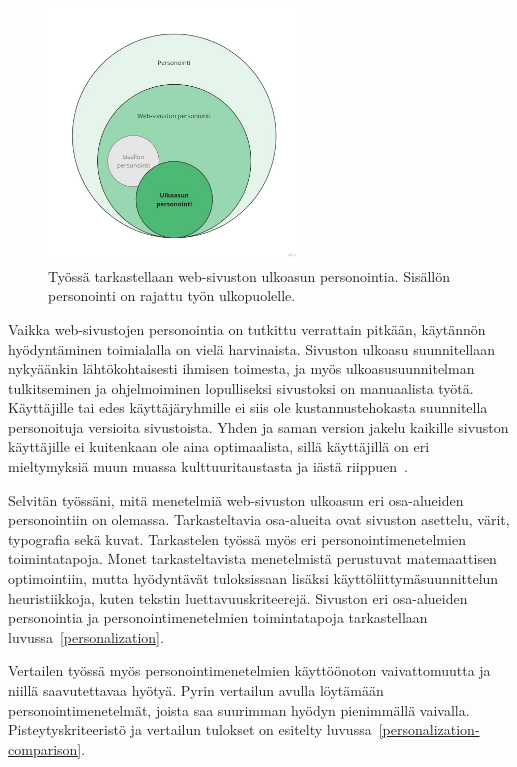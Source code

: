 \documentclass[finnish, 12pt, a4paper, elec, utf8, a-1b]{aaltothesis}
\begin{document}
\begin{figure}[h]
    \centering
    \includegraphics[width=0.6\textwidth]{images/thesis-scope.jpg}
    \caption{Työssä tarkastellaan web-sivuston ulkoasun personointia. Sisällön
    personointi on rajattu työn ulkopuolelle.~\label{fig:thesis-scope}}
\end{figure}

Vaikka web-sivustojen personointia on tutkittu verrattain pitkään, käytännön
hyödyntäminen toimialalla on vielä harvinaista. Sivuston ulkoasu suunnitellaan
nykyäänkin lähtökohtaisesti ihmisen toimesta, ja myös ulkoasusuunnitelman
tulkitseminen ja ohjelmoiminen lopulliseksi sivustoksi on manuaalista työtä.
Käyttäjille tai edes käyttäjäryhmille ei siis ole kustannustehokasta suunnitella
personoituja versioita sivustoista. Yhden ja saman version jakelu kaikille
sivuston käyttäjille ei kuitenkaan ole aina optimaalista, sillä käyttäjillä on
eri mieltymyksiä muun muassa kulttuuritaustasta ja iästä
riippuen~\cite{10.1145/2556288.2557052}.

Selvitän työssäni, mitä menetelmiä web-sivuston ulkoasun eri osa-alueiden
personointiin on olemassa. Tarkasteltavia osa-alueita ovat sivuston asettelu,
värit, typografia sekä kuvat. Tarkastelen työssä myös eri personointimenetelmien
toimintatapoja. Monet tarkasteltavista menetelmistä perustuvat matemaattisen
optimointiin, mutta hyödyntävät tuloksissaan lisäksi käyttöliittymäsuunnittelun
heuristiikkoja, kuten tekstin luettavuuskriteerejä. Sivuston eri osa-alueiden
personointia ja personointimenetelmien toimintatapoja tarkastellaan
luvussa~\ref{personalization}.

Vertailen työssä myös personointimenetelmien käyttöönoton vaivattomuutta ja
niillä saavutettavaa hyötyä. Pyrin vertailun avulla löytämään
personointimenetelmät, joista saa suurimman hyödyn pienimmällä vaivalla.
Pisteytyskriteeristö ja vertailun tulokset on esitelty
luvussa~\ref{personalization-comparison}.
\end{document}
